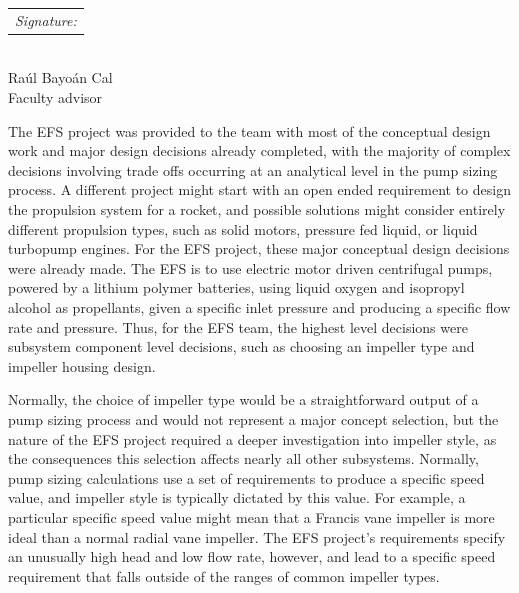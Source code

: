 \documentclass[11pt,twoside,a4paper,openright]{report}
\begin{document}
\begin{flushright}
\begin{tabular}[t]{@{}p{3.5in}@{}}
  \\[-2ex]
  \strut \textit{Signature: }\underline{\hspace{2.75in}}\strut
  \end{tabular}\\
  {Ra\'{u}l Bayo\'{a}n Cal}\\
Faculty advisor
\end{flushright}

\newpage
\setcounter{page}{1}
\vspace{12pt}
The EFS project was provided to the team with most of the conceptual design work and major design decisions already completed, with the majority of complex decisions involving trade offs occurring at an analytical level in the pump sizing process. A different project might start with an open ended requirement to design the propulsion system for a rocket, and possible solutions might consider entirely different propulsion types, such as solid motors, pressure fed liquid, or liquid turbopump engines. For the EFS project, these major conceptual design decisions were already made. The EFS is to use electric motor driven centrifugal pumps, powered by a lithium polymer batteries, using liquid oxygen and isopropyl alcohol as propellants, given a specific inlet pressure and producing a specific flow rate and pressure. Thus, for the EFS team, the highest level decisions were subsystem component level decisions, such as choosing an impeller type and impeller housing design.\par
\vspace{12pt}
\vspace{12pt}
Normally, the choice of impeller type would be a straightforward output of a pump sizing process and would not represent a major concept selection, but the nature of the EFS project required a deeper investigation into impeller style, as the consequences this selection affects nearly all other subsystems. Normally, pump sizing calculations use a set of requirements to  produce a specific speed value, and impeller style is typically dictated by this value. For example, a particular specific speed value might mean that a Francis vane impeller is more ideal than a normal radial vane impeller. The EFS project’s requirements specify an unusually high head and low flow rate, however, and lead to a specific speed requirement that falls outside of the ranges of common impeller types. \par
	
\end{document}
